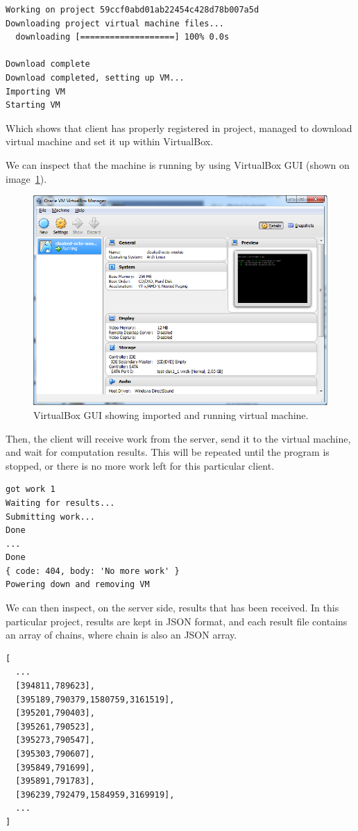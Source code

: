 \begin{lstlisting}[caption=Standard output of client application.]
Working on project 59ccf0abd01ab22454c428d78b007a5d
Downloading project virtual machine files...
  downloading [===================] 100% 0.0s

Download complete
Download completed, setting up VM...
Importing VM
Starting VM
\end{lstlisting}

Which shows that client has properly registered in project, managed to download virtual machine and set it up within VirtualBox.

We can inspect that the machine is running by using VirtualBox GUI (shown on image~\ref{f:vboxgui}).

\begin{figure}
\centering
\includegraphics[width=\textwidth]{images/virtualbox.png}
\caption{VirtualBox GUI showing imported and running virtual machine.}
\label{f:vboxgui}
\end{figure}

Then, the client will receive work from the server, send it to the virtual machine, and wait for computation results. This will be repeated until the program is stopped, or there is no more work left for this particular client.

\begin{lstlisting}[caption=Standard output of client application.]
got work 1
Waiting for results...
Submitting work...
Done
...
Done
{ code: 404, body: 'No more work' }
Powering down and removing VM
\end{lstlisting}

We can then inspect, on the server side, results that has been received. In this particular project, results are kept in JSON format, and each result file contains an array of chains, where chain is also an JSON array.

\begin{lstlisting}[caption=Listing of example result file.]
[
  ...
  [394811,789623],
  [395189,790379,1580759,3161519],
  [395201,790403],
  [395261,790523],
  [395273,790547],
  [395303,790607],
  [395849,791699],
  [395891,791783],
  [396239,792479,1584959,3169919],
  ...
]
\end{lstlisting}